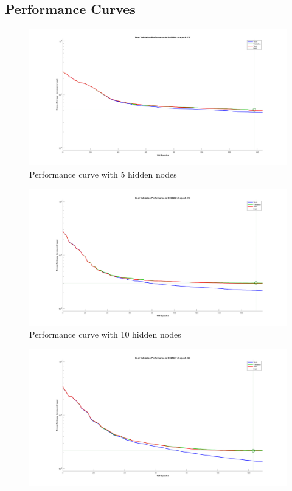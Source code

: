 \documentclass{article}
\begin{document}
{    \subsection*{Performance Curves}
    {
        \begin{figure}[H]
            \centering
            \includegraphics[width = 1.0\linewidth]{src1/Performance_5.png}
            \caption{Performance curve with 5 hidden nodes}
        \end{figure}
        \begin{figure}[H]
            \centering
            \includegraphics[width = 1.0\linewidth]{src1/Performance_10.png}
            \caption{Performance curve with 10 hidden nodes}
        \end{figure}
        \begin{figure}[H]
            \centering
            \includegraphics[width = 1.0\linewidth]{src1/Performance_20.png}

\end{figure}}}
\end{document}
